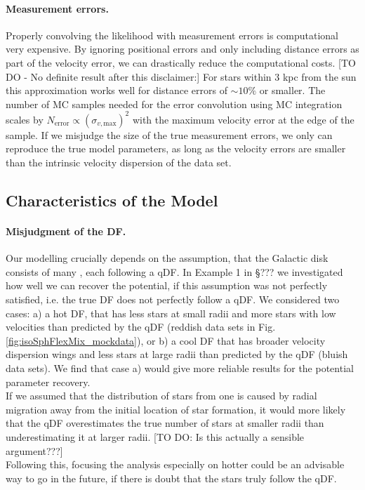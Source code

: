 \paragraph{Measurement errors.} Properly convolving the likelihood with measurement errors is computational very expensive. By ignoring positional errors and only including distance errors as part of the velocity error, we can drastically reduce the computational costs. [TO DO - No definite result after this disclaimer:] For stars within 3 kpc from the sun this approximation works well for distance errors of $\sim 10\%$ or smaller. The number of MC samples needed for the error convolution using MC integration scales by $N_\text{error} \propto (\sigma_{v,\text{max}})^2$ with the maximum velocity error at the edge of the sample. If we misjudge the size of the true measurement errors, we only can reproduce the true model parameters, as long as the velocity errors are smaller than the intrinsic velocity dispersion of the data set.

\subsection{Characteristics of the Model}

\paragraph{Misjudgment of the DF.} Our modelling crucially depends on the assumption, that the Galactic disk consists of many \MAPs, each following a qDF. In Example 1 in \S ??? we investigated how well we can recover the potential, if this assumption was not perfectly satisfied, i.e. the \MAPs true DF does not perfectly follow a qDF. We considered two cases: a) a hot DF, that has less stars at small radii and more stars with low velocities than predicted by the qDF (reddish data sets in Fig. \ref{fig:isoSphFlexMix_mockdata}), or b) a cool DF that has broader velocity dispersion wings and less stars at large radii than predicted by the qDF (bluish data sets). We find that case a) would give more reliable results for the potential parameter recovery.
\\If we assumed that the distribution of stars from one \MAP is caused by radial migration away from the initial location of star formation, it would more likely that the qDF overestimates the true number of stars at smaller radii than underestimating it at larger radii. [TO DO: Is this actually a sensible argument???]
\\Following this, focusing the analysis especially on hotter \MAPs could be an advisable way to go in the future, if there is doubt that the stars truly follow the qDF.

